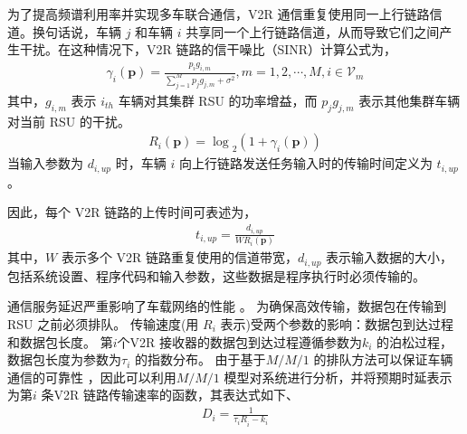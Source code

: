 为了提高频谱利用率并实现多车联合通信，V2R 通信重复使用同一上行链路信道。换句话说，车辆 $j$ 和车辆 $i$ 共享同一个上行链路信道，从而导致它们之间产生干扰。在这种情况下，V2R 链路的信干噪比（SINR）计算公式为，
\begin{eqnarray}\label{E3}
\gamma_i\left(\mathbf{p}\right)=\frac{p_ig_{i,m}}{{\sum_{j=1}^{M}{p_jg_{j,m}}+\sigma^2}}, m=1,2,\cdots ,M , i\in {{\mathcal{V}}_{m}}
\end{eqnarray}
其中，$g_{i,m}$ 表示 $i_{th}$ 车辆对其集群 RSU 的功率增益，而 ${p_jg_{j,m}}$ 表示其他集群车辆对当前 RSU 的干扰。
\begin{eqnarray}\label{E4}
{R_i\left(\mathbf{p}\right)=\log}_2{\left(1+ \gamma_i\left(\mathbf{p}\right) \right)}
\end{eqnarray}
当输入参数为 $d_{i,up}$ 时，车辆 $i$ 向上行链路发送任务输入时的传输时间定义为 $t_{i,up}$。

因此，每个 V2R 链路的上传时间可表述为，
\begin{eqnarray}\label{E6}
t_{i,up}=\frac{d_{i,up}}{WR_i\left(\mathbf{p}\right)}
\end{eqnarray}
其中，$W$ 表示多个 V2R 链路重复使用的信道带宽，$d_{i,up}$ 表示输入数据的大小，包括系统设置、程序代码和输入参数，这些数据是程序执行时必须传输的。

通信服务延迟严重影响了车载网络的性能 \cite{RAI}。 为确保高效传输，数据包在传输到 RSU 之前必须排队。 传输速度(用 $R_i$ 表示)受两个参数的影响：数据包到达过程和数据包长度。  第$i$个V2R 接收器的数据包到达过程遵循参数为$k_i$ 的泊松过程，数据包长度为参数为$\tau_i$ 的指数分布。 由于基于$M/M/1$ 的排队方法可以保证车辆通信的可靠性 \cite{Guo2019}，因此可以利用$M/M/1$ 模型对系统进行分析，并将预期时延表示为第$i$ 条V2R 链路传输速率的函数，其表达式如下、
\begin{eqnarray}\label{E7}
D_i=\frac{1}{{\tau_iR}_i-k_i}
\end{eqnarray}

